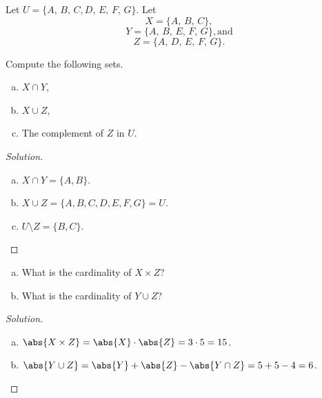 \documentclass[12pt]{amsart}
\begin{document}
\newpage

\noindent Let $U = \{A,\, B,\, C, D,\, E,\, F,\, G\}$.
Let 
$$X = \{A,\, B,\, C\},$$
$$Y = \{A,\, B,\, E,\, F,\, G\}, \text{and}$$
$$Z = \{A,\, D,\, E,\, F,\, G\}.$$
\begin{thm}[10 Points]\label{ex4}
  Compute the following sets.
  \begin{enumerate}[(a)]
  \item
    $X \cap Y$,
  \item
    $X \cup Z$,
  \item
    The complement of $Z$ in $U$.
  \end{enumerate}
  \begin{proof}[Solution]
    \begin{enumerate}[(a)]
    \item
      $X \cap Y = \{A, B\}$.
    \item
      $X \cup Z = \{A,B,C,D,E,F,G\} = U$.
    \item
      $U \setminus Z = \{B,C\}$.
    \end{enumerate}
  \end{proof}
\end{thm}

\newpage

\begin{thm}[10 Points]
  \begin{enumerate}[(a)]
  \item
    What is the cardinality of $X \times Z$?
  \item
    What is the cardinality of $Y \cup Z$?
  \end{enumerate}
  \begin{proof}[Solution]
    \begin{enumerate}[(a)]
    \item
      $\abs{X \times Z} = \abs{X}\cdot \abs{Z} = 3 \cdot 5 = 15$.
    \item
      $\abs{Y \cup Z} = \abs{Y} + \abs{Z} - \abs{Y \cap Z} = 5 + 5 - 4 = 6$.
    \end{enumerate}
  \end{proof}
\end{thm}
\newpage
\end{document}
